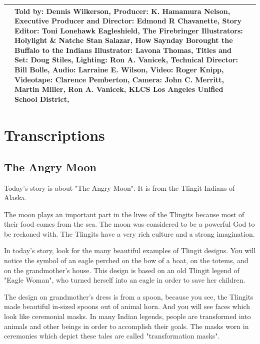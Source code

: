 \begin{table}[h]
\begin{small}
\begin{tabular}{|p{1.5cm}|p{8.5cm}|p{7cm}|}
                                 &
            Told by: Dennis Wilkerson,
            Producer: K. Hamamura Nelson,
            Executive Producer and Director: Edmond R Chavanette,
            Story Editor: Toni Lonehawk Eagleshield,
            The Firebringer Illustrators: Holylight \& Natche Stan Salazar,
            How Saynday Borought the Buffalo to the Indians Illustrator: Lavona Thomas,
            Titles and Set: Doug Stiles,
            Lighting: Ron A. Vanicek,
            Technical Director: Bill Bolle,
            Audio: Larraine E. Wilson,
            Video: Roger Knipp,
            Videotape: Clarence Pemberton,
            Camera: John C. Merritt, Martin Miller, Ron A. Vanicek,
            KLCS Los Angeles Unified School District,
            \\
            \hline
        \end{tabular}
    \end{small}

\end{table}

\clearpage
\newpage

\section{Transcriptions}

\subsection{The Angry Moon}

Today's story is about "The Angry Moon". It is from the Tlingit Indians of Alaska.

The moon plays an important part in the lives of the Tlingits because most of their food comes from the sea. The moon was considered to be a powerful God to be reckoned with. The Tlingits have a very rich culture and a strong imagination.

In today's story, look for the many beautiful examples of Tlingit designs. You will notice the symbol of an eagle perched on the bow of a boat, on the totems, and on the grandmother's house. This design is based on an old Tlingit legend of "Eagle Woman", who turned herself into an eagle in order to save her children.

The design on grandmother's dress is from a spoon, because you see, the Tlingits made beautiful in-sized spoons out of animal horn. And you will see faces which look like ceremonial masks. In many Indian legends, people are transformed into animals and other beings in order to accomplish their goals. The masks worn in ceremonies which depict these tales are called "transformation masks".

